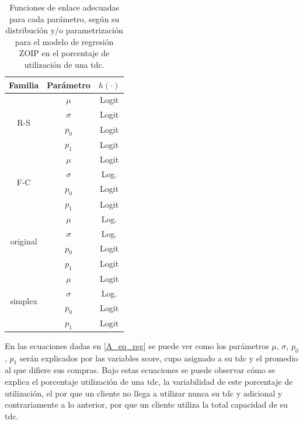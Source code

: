 \begin{table}[!hbt]
{\scriptsize
\begin{center}
\begin{tabular}{|c|c|c|}\hline
Familia & Par\'{a}metro & $h(\cdot)$ \\ \hline
\multirow{4}{*}{R-S} & $\mu$ & Logit \\
 & $\sigma$ & Logit \\
 & $p_0$ & Logit \\
 & $p_1$ & Logit \\ \hline

\multirow{4}{*}{F-C} & $\mu$ & Logit \\
 & $\sigma$ & Log. \\
 & $p_0$ & Logit \\
 & $p_1$ & Logit \\ \hline

\multirow{4}{*}{original} & $\mu$ & Log. \\
 & $\sigma$ & Log. \\
 & $p_0$ & Logit \\
 & $p_1$ & Logit \\ \hline

\multirow{4}{*}{simplex} & $\mu$ & Logit \\
 & $\sigma$ & Log. \\
 & $p_0$ & Logit \\
 & $p_1$ & Logit \\ \hline

\end{tabular}
\caption{Funciones de enlace adecuadas para cada par\'{a}metro, seg\'{u}n su distribuci\'{o}n y/o parametrizaci\'{o}n para el modelo de regresi\'{o}n ZOIP en el porcentaje de utilizaci\'{o}n de una tdc.}
\label{T_F_enlace2}
\end{center}
}
\end{table}

En las ecuaciones dadas en \eqref{A_eq_reg} se puede ver como los par\'{a}metros $\mu$, $\sigma$, $p_0$, $p_1$ ser\'{a}n explicados por las variables score, cupo asignado a su tdc y el promedio al que difiere sus compras. Bajo estas ecuaciones se puede observar c\'{o}mo se explica el porcentaje utilizaci\'{o}n de una tdc, la variabilidad de este porcentaje de utilizaci\'{o}n, el por que un cliente no llega a utilizar nunca su tdc y adicional y contrariamente a lo anterior, por que un cliente utiliza la total capacidad de su tdc.\\


